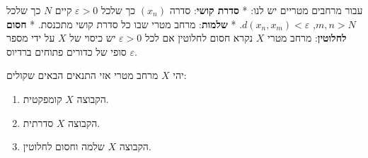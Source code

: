 \documentclass{tstextbook}
\begin{document}
\begin{reminder}
עבור מרחבים מטריים יש לנו:
* \textbf{סדרת קושי}: סדרה \((x_n)\) כך שלכל \(\varepsilon > 0\) קיים \(N\) כך שלכל \(m, n > N\), \(d(x_n, x_m) < \varepsilon\).
* \textbf{שלמות}: מרחב מטרי שבו כל סדרת קושי מתכנסת.
* \textbf{חסום לחלוטין}: מרחב מטרי \(X\) נקרא חסום לחלוטין אם לכל \(\varepsilon> 0\) יש כיסוי של \(X\) על ידי מספר סופי של כדורים פתוחים ברדיוס \(\varepsilon\).

\end{reminder}
\begin{theorem}
יהי \(X\) מרחב מטרי אזי התנאים הבאים שקולים:

  \begin{enumerate}
    \item הקבוצה \(X\) קומפקטית. 


    \item הקבוצה \(X\) סדרתית. 


    \item הקבוצה \(X\) שלמה וחסום לחלוטין. 


  \end{enumerate}
\end{theorem}
\end{document}
